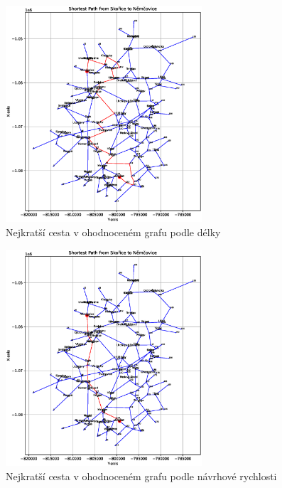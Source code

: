 \begin{figure}[H]
    \centering
    \includegraphics[width=0.65\textwidth]{images/Figure_1_length.eps}
    \caption{Nejkratší cesta v ohodnoceném grafu podle délky}
\end{figure}
\begin{figure}[H]
    \centering
    \includegraphics[width=0.65\textwidth]{images/Figure_1_speed.eps}
    \caption{Nejkratší cesta v ohodnoceném grafu podle návrhové rychlosti}
\end{figure}

